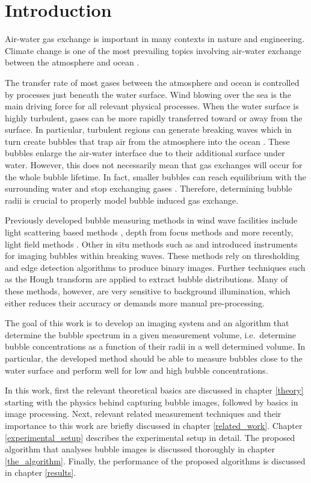 \chapter{Introduction}
	Air-water gas exchange is important in many contexts in nature and engineering. Climate change is one of the most prevailing topics involving air-water exchange between the atmosphere and ocean \citep{MischlerDiss}.
	
	The transfer rate of most gases between the atmosphere and ocean is controlled by processes just beneath the water surface. Wind blowing over the sea is the main driving force for all relevant physical processes. 
	When the water surface is highly turbulent, gases can be more rapidly transferred toward or away from the surface. In particular, turbulent regions can generate breaking waves which in turn create bubbles that trap air from the atmosphere into the ocean \citep{Terry}. These bubbles enlarge the air-water interface due to their additional surface under water. However, this does not necessarily mean that gas exchanges will occur for the whole bubble lifetime. In fact, smaller bubbles can reach equilibrium with the surrounding water and stop exchanging gases \citep{MischlerDiss}. Therefore, determining bubble radii is crucial to properly model bubble induced gas exchange.
	
	Previously developed bubble measuring methods in wind wave facilities include light scattering based methods \citep{jaehne1984}, depth from focus methods \citep{geissler_1995} and more recently, light field methods \citep{MischlerDiss}. Other in situ methods such as \citet{Al-Lashi2016} and \citet{Leifer2003} introduced instruments for imaging bubbles within breaking waves. These methods rely on thresholding and edge detection algorithms to produce binary images. Further techniques such as the Hough transform \citep{Hough1972} are applied to extract bubble distributions. Many of these methods, however, are very sensitive to background illumination, which either reduces their accuracy \citep{Zhong2016} or demands more manual pre-processing.
	
	The goal of this work is to develop an imaging system and an algorithm that determine the bubble spectrum in a given measurement volume, i.e.\ determine bubble concentrations as a function of their radii in a well determined volume. In particular, the developed method should be able to measure bubbles close to the water surface and perform well for low and high bubble concentrations.  
	
	In this work, first the relevant theoretical basics are discussed in chapter \ref{theory} starting with the physics behind capturing bubble images, followed by basics in image processing. Next, relevant related measurement techniques and their importance to this work are briefly discussed in chapter \ref{related_work}. Chapter \ref{experimental_setup} describes the experimental setup in detail. The proposed algorithm that analyses bubble images is discussed thoroughly in chapter \ref{the_algorithm}. Finally, the performance of the proposed algorithms is discussed in chapter \ref{results}.